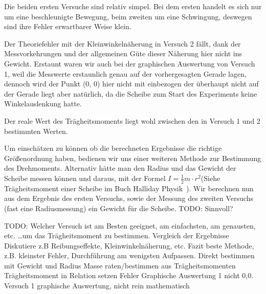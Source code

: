 \documentclass{article}
\begin{document}
	Die beiden ersten Versuche sind relativ simpel. Bei dem ersten handelt es sich nur um eine beschleunigte Bewegung, beim zweiten um eine Schwingung, deswegen
	sind ihre Fehler erwartbarer Weise klein.

	Der Theoriefehler mit der Kleinwinkelnäherung in Versuch 2 fällt, dank der Messvorkehrungen und der allgemeinen Güte dieser Näherung hier nicht ins Gewicht.
	Erstaunt waren wir auch bei der graphischen Auswertung von Versuch 1, weil die Messwerte erstaunlich genau auf der vorhergesagten Gerade lagen,
	dennoch wird der Punkt (0, 0) hier nicht mit einbezogen der überhaupt nicht auf der Gerade liegt aber natürlich, da die Scheibe zum Start des Experiments keine Winkelauslenkung hatte.

	Der reale Wert des Trägheitsmoments liegt wohl zwischen den in Versuch 1 und 2 bestimmten Werten.

	Um einschätzen zu können ob die berechneten Ergebnisse die richtige Größenordnung haben, bedienen wir uns einer weiteren Methode zur Bestimmung des Drehmoments.
	Alternativ hätte man den Radius und das Gewicht der Scheibe messen können und daraus, mit der Formel \( I = \frac{1}{2} m \cdot r^2 \)(Siehe Trägheitsmoment einer Scheibe im Buch Halliday Physik~\cite{HallidayPhysik}).
	Wir berechnen nun aus dem Ergebnis des ersten Versuchs, sowie der Messung des zweiten Versuchs (fast eine Radiusmessung) ein Gewicht für die Scheibe. TODO: Sinnvoll?

	TODO: Welcher Versuch ist am Besten geeignet, am einfachsten, am genausten, etc. \ldots um das Trägheitsmoment zu bestimmen.
	Vergleich der Ergebnisse
	Diskutiere z.B Reibungseffekte, Kleinwinkelnäherung, etc.
	Fazit beste Methode, z.B. kleinster Fehler, Durchführung am wenigsten Aufpassen.
	Direkt bestimmen mit Gewicht und Radius
	Masse raten/bestimmen aus Trägheitsmomenten
	Trägheitsmoment in Relation setzen
	Fehler Graphische Auswertung 1 nicht 0,0.
	Versuch 1 graphische Auswertung, nicht rein mathematisch

	\printbibliography[title={Quellen}]
\end{document}
